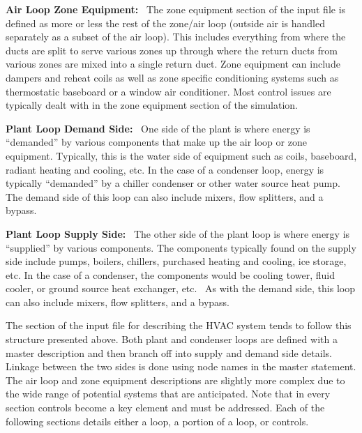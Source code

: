 \textbf{Air Loop Zone Equipment:} ~The zone equipment section of the input file is defined as more or less the rest of the zone/air loop (outside air is handled separately as a subset of the air loop). This includes everything from where the ducts are split to serve various zones up through where the return ducts from various zones are mixed into a single return duct. Zone equipment can include dampers and reheat coils as well as zone specific conditioning systems such as thermostatic baseboard or a window air conditioner. Most control issues are typically dealt with in the zone equipment section of the simulation.

\textbf{Plant Loop Demand Side:}~ One side of the plant is where energy is ``demanded'' by various components that make up the air loop or zone equipment. Typically, this is the water side of equipment such as coils, baseboard, radiant heating and cooling, etc. In the case of a condenser loop, energy is typically ``demanded'' by a chiller condenser or other water source heat pump. The demand side of this loop can also include mixers, flow splitters, and a bypass.

\textbf{Plant Loop Supply Side:} ~The other side of the plant loop is where energy is ``supplied'' by various components. The components typically found on the supply side include pumps, boilers, chillers, purchased heating and cooling, ice storage, etc. In the case of a condenser, the components would be cooling tower, fluid cooler, or ground source heat exchanger, etc.~ As with the demand side, this loop can also include mixers, flow splitters, and a bypass.

The section of the input file for describing the HVAC system tends to follow this structure presented above. Both plant and condenser loops are defined with a master description and then branch off into supply and demand side details. Linkage between the two sides is done using node names in the master statement. The air loop and zone equipment descriptions are slightly more complex due to the wide range of potential systems that are anticipated. Note that in every section controls become a key element and must be addressed. Each of the following sections details either a loop, a portion of a loop, or controls.